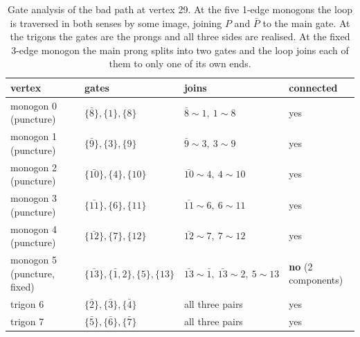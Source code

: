 \documentclass[12pt]{amsart}
\newcommand{\anti}[1]{\bar{#1}}          %
\newcommand{\per}{P}                      %
\newcommand{\set}[1]{\{#1\}}
\theoremstyle{plain}
\theoremstyle{definition}
\begin{document}
\begin{table}[h]
  \centering
  \small
  \begin{tabular}{@{}llll@{}}
    \toprule
    vertex & gates & joins & connected \\
    \midrule
    monogon 0 (puncture)  & $\set{\anti8},\set{1},\set{8}$ & $\anti8\!\sim\!1,\ 1\!\sim\!8$ & yes \\
    monogon 1 (puncture)  & $\set{\anti9},\set{3},\set{9}$ & $\anti9\!\sim\!3,\ 3\!\sim\!9$ & yes \\
    monogon 2 (puncture)  & $\set{\anti{10}},\set{4},\set{10}$ & $\anti{10}\!\sim\!4,\ 4\!\sim\!10$ & yes \\
    monogon 3 (puncture)  & $\set{\anti{11}},\set{6},\set{11}$ & $\anti{11}\!\sim\!6,\ 6\!\sim\!11$ & yes \\
    monogon 4 (puncture)  & $\set{\anti{12}},\set{7},\set{12}$ & $\anti{12}\!\sim\!7,\ 7\!\sim\!12$ & yes \\
    monogon 5 (puncture, fixed) & $\set{\anti{13}},\set{\anti1,2},\set{5},\set{13}$
       & $\anti{13}\!\sim\!\anti1,\ \anti{13}\!\sim\!2,\ 5\!\sim\!13$ & \textbf{no} (2 components) \\
    trigon 6 & $\set{\anti2},\set{\anti3},\set{\anti4}$ & all three pairs & yes \\
    trigon 7 & $\set{\anti5},\set{\anti6},\set{\anti7}$ & all three pairs & yes \\
    \bottomrule
  \end{tabular}
  \caption{Gate analysis of the bad path at vertex 29.  At the five 1-edge
    monogons the loop is traversed in both senses by some image, joining
    $\per$ and $\anti\per$ to the main gate.  At the trigons the gates are
    the prongs and all three sides are realised.  At the fixed 3-edge
    monogon the main prong splits into two gates and the loop joins each
    of them to only one of its own ends.}
  \label{tab:gates}
\end{table}
\end{document}
